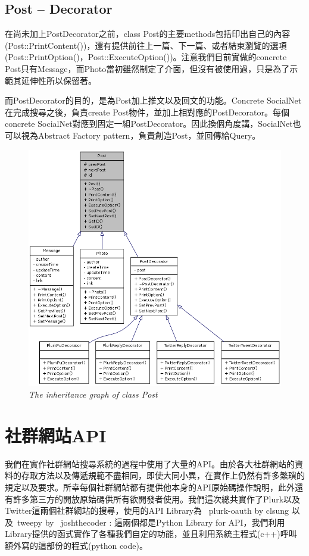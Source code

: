 \documentclass[12pt]{article}
\begin{document}
\subsection{Post -- Decorator}

在尚未加上PostDecorator之前，class Post的主要methods包括印出自己的內容(Post::PrintContent())，還有提供前往上一篇、下一篇、或者結束瀏覽的選項(Post::PrintOption()，Post::ExecuteOption())。注意我們目前實做的concrete Post只有Message，而Photo當初雖然制定了介面，但沒有被使用過，只是為了示範其延伸性所以保留著。

而PostDecorator的目的，是為Post加上推文以及回文的功能。Concrete SocialNet在完成搜尋之後，負責create Post物件，並加上相對應的PostDecorator。每個concrete SocialNet對應到固定一組PostDecorator。因此換個角度講，SocialNet也可以視為Abstract Factory pattern，負責創造Post，並回傳給Query。

\begin{figure}[t]
\centering
\includegraphics[width=15cm]{classPost__inherit__graph.png}
\caption{{\it The inheritance graph of class Post}}
\label{fig:Post_inherit}
\end{figure}

\section{社群網站API}

我們在實作社群網站搜尋系統的過程中使用了大量的API。由於各大社群網站的資料的存取方法以及傳遞規範不盡相同，即使大同小異，在實作上仍然有許多繁瑣的規定以及要求。所幸每個社群網站都有提供他本身的API原始碼操作說明，此外還有許多第三方的開放原始碼供所有欲開發者使用。我們這次總共實作了Plurk以及Twitter這兩個社群網站的搜尋，使用的API Library為  plurk-oauth by clsung 以及 tweepy by  joshthecoder : 這兩個都是Python Library for API，我們利用Library提供的函式實作了各種我們自定的功能，並且利用系統主程式(c++)呼叫額外寫的這部份的程式(python code)。
\end{document}

